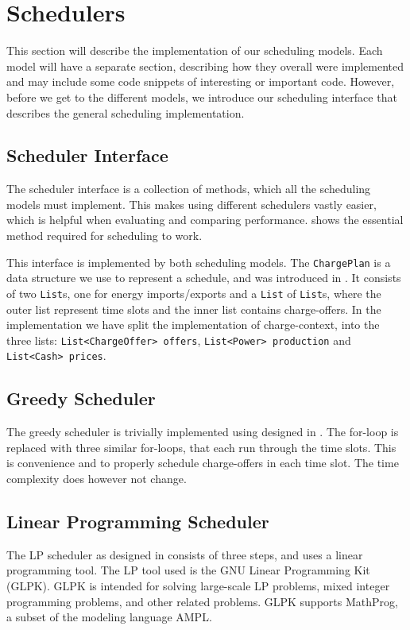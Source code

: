 \section{Schedulers}\label{sec:schedimpl}
This section will describe the implementation of our scheduling models. Each model will have a separate section, describing how they overall were implemented and may include some code snippets of interesting or important code. However, before we get to the different models, we introduce our scheduling interface that describes the general scheduling implementation.

\subsection{Scheduler Interface}
The scheduler interface is a collection of methods, which all the scheduling models must implement. This makes using different schedulers vastly easier, which is helpful when evaluating and comparing performance.  shows the essential method required for scheduling to work.



This interface is implemented by both scheduling models. The \texttt{ChargePlan} is a data structure we use to represent a schedule, and was introduced in . It consists of two \texttt{List}s, one for energy imports\slash exports and a \texttt{List} of \texttt{List}s, where the outer list represent time slots and the inner list contains charge-offers. In the implementation we have split the implementation of charge-context, into the three lists: \texttt{List<ChargeOffer> offers}, \texttt{List<Power> production} and \texttt{List<Cash> prices}.

\subsection{Greedy Scheduler}
The greedy scheduler is trivially implemented using  designed in . The for-loop is replaced with three similar for-loops, that each run through the time slots. This is convenience and to properly schedule charge-offers in each time slot. The time complexity does however not change. %

\subsection{Linear Programming Scheduler}
The LP scheduler as designed in  consists of three steps, and uses a linear programming tool. The LP tool used is the GNU Linear Programming Kit (GLPK). GLPK is intended for solving large-scale LP problems, mixed integer programming problems, and other related problems. GLPK supports MathProg, a subset of the modeling language AMPL. 

